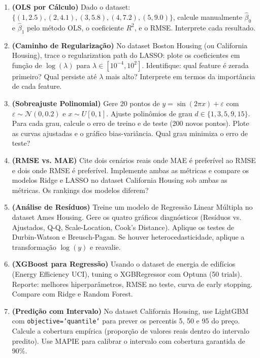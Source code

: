 \documentclass[12pt,a4paper]{article}
\begin{document}
\begin{enumerate}[leftmargin=2em,label=\textcolor{mineblue}{\textbf{E\arabic*.}}]

  \item \textbf{(OLS por Cálculo)} Dado o dataset: $\{(1, 2.5), (2, 4.1), (3, 5.8), (4, 7.2), (5, 9.0)\}$, calcule manualmente $\hat{\beta}_0$ e $\hat{\beta}_1$ pelo método OLS, o coeficiente $R^2$, e o RMSE. Interprete cada resultado.

  \item \textbf{(Caminho de Regularização)} No dataset Boston Housing (ou California Housing), trace o regularization path do LASSO: plote os coeficientes em função de $\log(\lambda)$ para $\lambda \in [10^{-4}, 10^2]$. Identifique: qual feature é zerada primeiro? Qual persiste até $\lambda$ mais alto? Interprete em termos da importância de cada feature.

  \item \textbf{(Sobreajuste Polinomial)} Gere 20 pontos de $y = \sin(2\pi x) + \varepsilon$ com $\varepsilon \sim \mathcal{N}(0, 0.2)$ e $x \sim U[0,1]$. Ajuste polinômios de grau $d \in \{1, 3, 5, 9, 15\}$. Para cada grau, calcule o erro de treino e de teste (200 novos pontos). Plote as curvas ajustadas e o gráfico bias-variância. Qual grau minimiza o erro de teste?

  \item \textbf{(RMSE vs. MAE)} Cite dois cenários reais onde MAE é preferível ao RMSE e dois onde RMSE é preferível. Implemente ambas as métricas e compare os modelos Ridge e LASSO no dataset California Housing sob ambas as métricas. Os rankings dos modelos diferem?

  \item \textbf{(Análise de Resíduos)} Treine um modelo de Regressão Linear Múltipla no dataset Ames Housing. Gere os quatro gráficos diagnósticos (Resíduos vs. Ajustados, Q-Q, Scale-Location, Cook's Distance). Aplique os testes de Durbin-Watson e Breusch-Pagan. Se houver heterocedasticidade, aplique a transformação $\log(y)$ e reavalie.

  \item \textbf{(XGBoost para Regressão)} Usando o dataset de energia de edifícios (Energy Efficiency UCI), tuning o XGBRegressor com Optuna (50 trials). Reporte: melhores hiperparâmetros, RMSE no teste, curva de early stopping. Compare com Ridge e Random Forest.

  \item \textbf{(Predição com Intervalo)} No dataset California Housing, use LightGBM com \texttt{objective='quantile'} para prever os percentis 5, 50 e 95 do preço. Calcule a cobertura empírica (proporção de valores reais dentro do intervalo predito). Use MAPIE para calibrar o intervalo com cobertura garantida de 90\%.

\end{enumerate}
\end{document}
